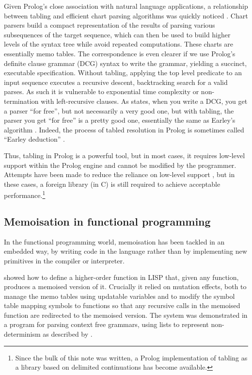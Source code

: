 Given Prolog's close association with natural language applications, a
relationship between tabling and efficient chart parsing algorithms
was quickly noticed \cite{Warren1975,PereiraWarren1983}. Chart parsers build a compact representation
of the results of parsing various subsequences of the target sequence, which
can then be used to build higher levels of the syntax tree while avoid repeated
computations. These charts are essentially memo tables. The correspondence is even clearer if we
use Prolog's definite clause grammar (DCG) syntax to write the grammar,
yielding a succinct, executable specification. Without tabling, applying the
top level predicate to an input sequence executes a recursive descent, backtracking
search for a valid parses. As such it is vulnerable to exponential time complexity
or non-termination with left-recursive clauses. As \citet{Warren1995}
states,  when you write a DCG, you get a parser ``for free'', but not necessarily
a very good one, but with tabling, the parser you get ``for free''
is a pretty good one, essentially the same as Earley's algorithm \cite{Earley1970}.
Indeed, the process of tabled resolution in Prolog is sometimes called ``Earley deduction''
\cite{Porter1986}.

Thus, tabling in Prolog is a powerful tool, but in most cases, it requires
low-level support within the Prolog engine and cannot be modified by the programmer.
Attempts have been made to reduce the reliance on low-level support 
\cite{RameshChen1997,De-GuzmanCarroHermenegildo2008}, but in these cases,
a foreign library (\eg in C) is still required to achieve acceptable
performance.\footnote{Since the bulk of this note was written, a Prolog implementation
of tabling as a library \cite{DesouterVan-DoorenSchrijvers2015} based on delimited 
continuations \cite{SchrijversDemoenDesouter2013} has become available.}


\subsection{Memoisation in functional programming}
\label{s:memofun}
In the functional programming world, memoisation has been tackled in an
embedded way, by writing code in the language rather than by implementing
new primitives in the compiler or interpreter.

\citet{Norvig1991} showed how to define a higher-order function in LISP that,
given any function, produces a memoised version of it. Crucially it relied
on mutation effects, both to manage the memo tables using updatable
variables and to modify the symbol table mapping symbols to functions so that
any recursive calls in the memoised function are redirected to the memoised
version. The system was demonstrated in a program for parsing context free grammars,
using lists to represent non-determinism as described by \citet{Wadler1985}.

